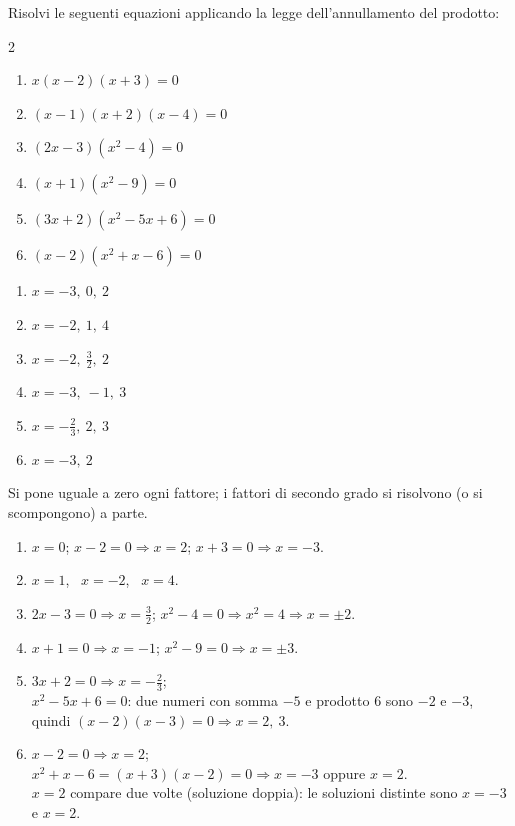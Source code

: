 
\begin{question}[ID=5.3, subtitle={Legge dell'annullamento del prodotto con fattori di secondo grado}, difficulty=media, tags={annullamento del prodotto}]
Risolvi le seguenti equazioni applicando la legge dell'annullamento del prodotto:
\begin{multicols}{2}
\begin{enumerate}[leftmargin=3cm]
    \item $x(x-2)(x+3)=0$
    \item $(x-1)(x+2)(x-4)=0$
    \item $(2x-3)(x^2-4)=0$
    \item $(x+1)(x^2-9)=0$
    \item $(3x+2)(x^2-5x+6)=0$
    \item $(x-2)(x^2+x-6)=0$
\end{enumerate}
\end{multicols}
\begin{solution}
\begin{enumerate}
    \item $x=-3,\ 0,\ 2$
    \item $x=-2,\ 1,\ 4$
    \item $x=-2,\ \tfrac32,\ 2$
    \item $x=-3,\ -1,\ 3$
    \item $x=-\tfrac23,\ 2,\ 3$
    \item $x=-3,\ 2$
\end{enumerate}
\end{solution}
\begin{explanation}
Si pone uguale a zero ogni fattore; i fattori di secondo grado si risolvono (o si scompongono) a parte.
\begin{enumerate}
    \item $x=0$; \quad $x-2=0 \Rightarrow x=2$; \quad $x+3=0 \Rightarrow x=-3$.
    \item $x=1$, \ $x=-2$, \ $x=4$.
    \item $2x-3=0 \Rightarrow x=\tfrac32$; \quad $x^2-4=0 \Rightarrow x^2=4 \Rightarrow x=\pm2$.
    \item $x+1=0 \Rightarrow x=-1$; \quad $x^2-9=0 \Rightarrow x=\pm3$.
    \item $3x+2=0 \Rightarrow x=-\tfrac23$; \\
    $x^2-5x+6=0$: due numeri con somma $-5$ e prodotto $6$ sono $-2$ e $-3$, quindi $(x-2)(x-3)=0 \Rightarrow x=2,\ 3$.
    \item $x-2=0 \Rightarrow x=2$; \\
    $x^2+x-6=(x+3)(x-2)=0 \Rightarrow x=-3$ oppure $x=2$. \\
    $x=2$ compare due volte (soluzione doppia): le soluzioni distinte sono $x=-3$ e $x=2$.
\end{enumerate}
\end{explanation}
\end{question}

